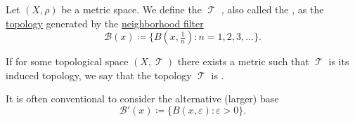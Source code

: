 \begin{definition}\label{def:metric_topology}
  Let \( (X, \rho) \) be a metric space. We define the \( \mscrT \) , also called the , as the \hyperref[def:topological_space]{topology} generated by the \hyperref[def:topological_local_base]{neighborhood filter}
  \begin{equation}\label{def:metric_topology/integer_base}
    \mathcal{B}(x) \coloneqq \{ B(x, \tfrac 1 n) \colon n = 1, 2, 3, \ldots \}.
  \end{equation}

  If for some topological space \( (X, \mscrT) \) there exists a metric such that \( \mscrT \) is its induced topology, we say that the topology \( \mscrT \) is .

  It is often conventional to consider the alternative (larger) base
  \begin{equation}\label{def:metric_topology/real_base}
    \mathcal{B}'(x) \coloneqq \{ B(x, \varepsilon) \colon \varepsilon > 0 \}.
  \end{equation}
\end{definition}

